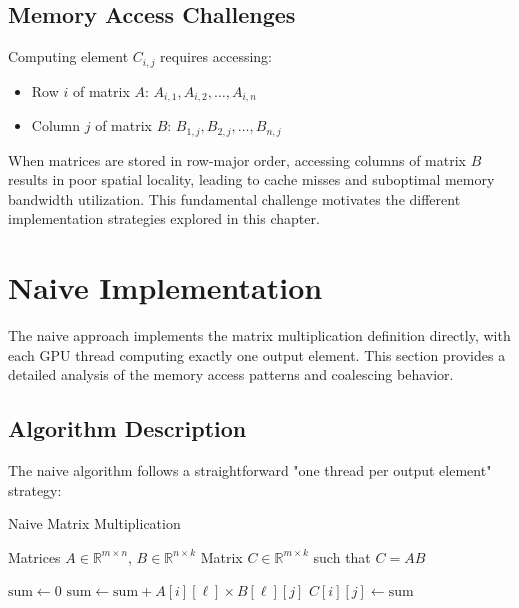 \documentclass{amsbook}
\theoremstyle{definition}
\begin{document}
\subsection{Memory Access Challenges}

Computing element $C_{i,j}$ requires accessing:
\begin{itemize}
\item Row $i$ of matrix $A$: $A_{i,1}, A_{i,2}, \ldots, A_{i,n}$
\item Column $j$ of matrix $B$: $B_{1,j}, B_{2,j}, \ldots, B_{n,j}$
\end{itemize}

When matrices are stored in row-major order, accessing columns of matrix $B$ results in poor spatial locality, leading to cache misses and suboptimal memory bandwidth utilization. This fundamental challenge motivates the different implementation strategies explored in this chapter.

\section{Naive Implementation}

The naive approach implements the matrix multiplication definition directly, with each GPU thread computing exactly one output element. This section provides a detailed analysis of the memory access patterns and coalescing behavior.

\subsection{Algorithm Description}

The naive algorithm follows a straightforward "one thread per output element" strategy:

\begin{algorithm}
\caption{Naive Matrix Multiplication}
\begin{algorithmic}[1]
\Require Matrices $A \in \mathbb{R}^{m \times n}$, $B \in \mathbb{R}^{n \times k}$
\Ensure Matrix $C \in \mathbb{R}^{m \times k}$ such that $C = AB$

    \State $\text{sum} \leftarrow 0$
        \State $\text{sum} \leftarrow \text{sum} + A[i][\ell] \times B[\ell][j]$
    \EndFor
    \State $C[i][j] \leftarrow \text{sum}$
\EndFor
\end{algorithmic}
\end{algorithm}
\end{document}

